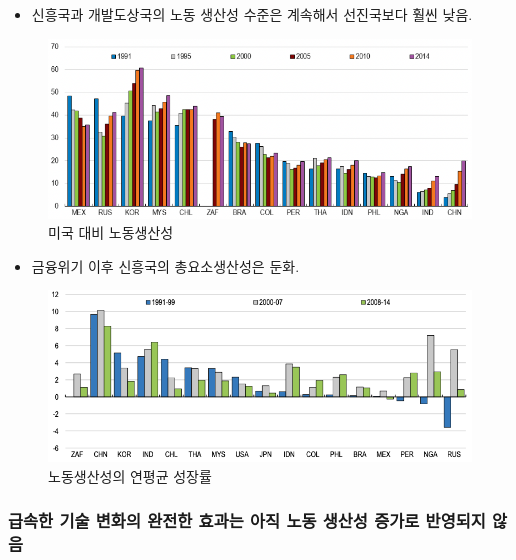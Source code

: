 \documentclass[aspectratio=169,xcolor=dvipsnames,handout]{beamer}
\begin{document}
\begin{frame}{}
    \begin{itemize}
        \item 신흥국과 개발도상국의 노동 생산성 수준은 계속해서 선진국보다 훨씬 낮음.
    \end{itemize}
    \begin{figure}
        \centering
        \includegraphics[scale=.3]{pic/tpin1.3.png}
        \caption{미국 대비 노동생산성}
    \end{figure}
\end{frame}

\begin{frame}{}
    \begin{itemize}
        \item 금융위기 이후 신흥국의 총요소생산성은 둔화.
    \end{itemize}
    \begin{figure}
        \centering
        \includegraphics[scale=.3]{pic/tpin1.4.png}
        \caption{노동생산성의 연평균 성장률}
    \end{figure}
\end{frame}

\subsubsection{ 급속한 기술 변화의 완전한 효과는 아직 노동 생산성 증가로 반영되지 않음}
\end{document}
